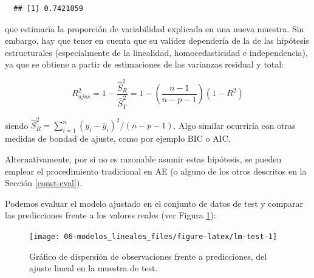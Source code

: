 \documentclass[
]{book}
\newenvironment{Shaded}{\begin{snugshade}}{\end{snugshade}}
\newcommand{\AttributeTok}[1]{\textcolor[rgb]{0.77,0.63,0.00}{#1}}
\newcommand{\CommentTok}[1]{\textcolor[rgb]{0.56,0.35,0.01}{\textit{#1}}}
\newcommand{\DecValTok}[1]{\textcolor[rgb]{0.00,0.00,0.81}{#1}}
\newcommand{\FunctionTok}[1]{\textcolor[rgb]{0.00,0.00,0.00}{#1}}
\newcommand{\NormalTok}[1]{#1}
\newcommand{\OtherTok}[1]{\textcolor[rgb]{0.56,0.35,0.01}{#1}}
\newcommand{\SpecialCharTok}[1]{\textcolor[rgb]{0.00,0.00,0.00}{#1}}
\newcommand{\StringTok}[1]{\textcolor[rgb]{0.31,0.60,0.02}{#1}}
\theoremstyle{break}
\theoremstyle{nonumberplain}
\renewcommand{\CommentTok}[1]{\textcolor[rgb]{0.41,0.41,0.41}{\texttt{#1}}}
\begin{document}
\begin{verbatim}
  ## [1] 0.7421059
\end{verbatim}

que estimaría la proporción de variabilidad explicada en una nueva muestra.
Sin embargo, hay que tener en cuenta que su validez dependería de la de las hipótesis estructurales (especialmente de la linealidad, homocedasticidad e independencia), ya que se obtiene a partir de estimaciones de las varianzas residual y total:

\[R_{ajus}^{2} = 1 - \frac{\hat{S}_{R}^{2}}{\hat{S}_{Y}^{2}} 
= 1 - \left( \frac{n-1}{n-p-1} \right) (1-R^{2})\]

siendo \(\hat{S}_{R}^{2}=\sum_{i=1}^{n}(y_{i}-\hat{y}_{i})^{2}/(n - p - 1)\).
Algo similar ocurriría con otras medidas de bondad de ajuste, como por ejemplo BIC o AIC.

Alternativamente, por si no es razonable asumir estas hipótesis, se pueden emplear el procedimiento tradicional en AE (o alguno de los otros descritos en la Sección \ref{const-eval}).

Podemos evaluar el modelo ajustado en el conjunto de datos de test y comparar las predicciones frente a los valores reales (ver Figura \ref{fig:lm-test}):

\begin{Shaded}
\end{Shaded}

\begin{figure}[!htb]

{\centering \texttt{[image: 06-modelos\_lineales\_files/figure-latex/lm-test-1]} 

}

\caption{Gráfico de dispersión de observaciones frente a predicciones, del ajuste lineal en la muestra de test.}\label{fig:lm-test}
\end{figure}
\end{document}
